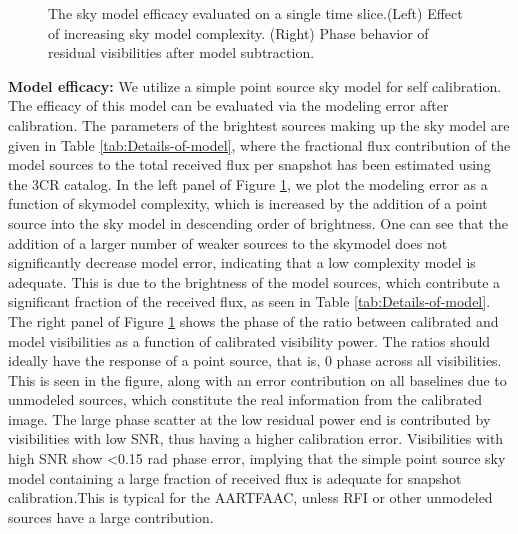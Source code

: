 \documentclass[referee]{aa}
\begin{document}
\begin{figure}[tbh]
\caption{\label{fig:The-model-amplitude}The  sky model  efficacy evaluated  on a
  single  time slice.(Left) Effect  of increasing  sky model  complexity. (Right)
  Phase behavior of residual visibilities after model subtraction.}
\end{figure}

\textbf{Model efficacy:  } We utilize a  simple point source sky  model for self
calibration. The efficacy of this model  can be evaluated via the modeling error
after calibration.   The parameters of the  brightest sources making  up the sky
model are  given in Table \ref{tab:Details-of-model}, where  the fractional flux
contribution of  the model sources to  the total received flux  per snapshot has
been  estimated   using  the  3CR  catalog.    In  the  left   panel  of  Figure
\ref{fig:The-model-amplitude},  we plot  the  modeling error  as  a function  of
skymodel complexity, which  is increased by the addition of  a point source into
the sky model  in descending order of brightness. One can  see that the addition
of a  larger number  of weaker  sources to the  skymodel does  not significantly
decrease model error, indicating that  a low complexity model is adequate.  This
is due  to the brightness of  the model sources, which  contribute a significant
fraction of the received flux, as seen in Table \ref{tab:Details-of-model}.  The
right panel of Figure \ref{fig:The-model-amplitude} shows the phase of the ratio
between calibrated and model visibilities as a function of calibrated visibility
power. The ratios should ideally have the response of a point source, that is, 0
phase across all visibilities.  This is  seen in the figure, along with an error
contribution on  all baselines  due to unmodeled  sources, which  constitute the
real information from  the calibrated image. The large phase  scatter at the low
residual power  end is contributed by  visibilities with low SNR,  thus having a
higher  calibration error.   Visibilities with  high  SNR show  <0.15 rad  phase
error,  implying that  the  simple point  source  sky model  containing a  large
fraction of received  flux is adequate for snapshot  calibration.This is typical
for  the  AARTFAAC,  unless  RFI   or  other  unmodeled  sources  have  a  large
contribution.
\end{document}
